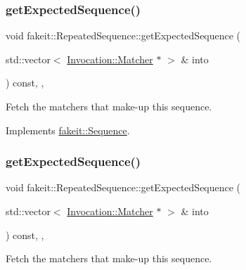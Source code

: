 \subsubsection{\texorpdfstring{getExpectedSequence()}{getExpectedSequence()}\hspace{0.1cm}{\footnotesize\ttfamily [2/9]}}
{\footnotesize\ttfamily void fakeit\+::\+Repeated\+Sequence\+::get\+Expected\+Sequence (\begin{DoxyParamCaption}\item[{std\+::vector$<$ \mbox{\hyperlink{structfakeit_1_1Invocation_1_1Matcher}{Invocation\+::\+Matcher}} $\ast$ $>$ \&}]{into }\end{DoxyParamCaption}) const\hspace{0.3cm}{\ttfamily [inline]}, {\ttfamily [override]}, {\ttfamily [virtual]}}



Fetch the matchers that make-\/up this sequence. 



Implements \mbox{\hyperlink{classfakeit_1_1Sequence_aa1a1e4ad2fcac3379ba38f250bf06884}{fakeit\+::\+Sequence}}.

\mbox{\label{classfakeit_1_1RepeatedSequence_a65b5f62fe0ba9da31b99f28c1a2e53f2}} 
\subsubsection{\texorpdfstring{getExpectedSequence()}{getExpectedSequence()}\hspace{0.1cm}{\footnotesize\ttfamily [3/9]}}
{\footnotesize\ttfamily void fakeit\+::\+Repeated\+Sequence\+::get\+Expected\+Sequence (\begin{DoxyParamCaption}\item[{std\+::vector$<$ \mbox{\hyperlink{structfakeit_1_1Invocation_1_1Matcher}{Invocation\+::\+Matcher}} $\ast$ $>$ \&}]{into }\end{DoxyParamCaption}) const\hspace{0.3cm}{\ttfamily [inline]}, {\ttfamily [override]}, {\ttfamily [virtual]}}



Fetch the matchers that make-\/up this sequence. 



